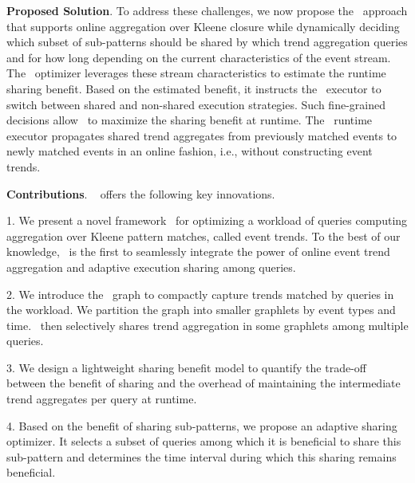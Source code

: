 \textbf{Proposed Solution}. 
To address these challenges, 
we now propose the \app\  approach that supports  online aggregation over Kleene closure while dynamically deciding which subset of sub-patterns should be shared by which trend aggregation queries and for how long depending on the current characteristics of the event stream.
The \app\ optimizer leverages these stream characteristics to estimate the runtime sharing benefit.  Based on the estimated benefit, it instructs the \app\ executor to switch between shared and non-shared execution strategies. Such fine-grained decisions allow \app\ to maximize the sharing benefit at runtime. 
%
The \app\ runtime executor propagates shared trend aggregates from previously matched events to newly matched events 
in an online fashion, i.e., without constructing event trends.

\textbf{Contributions}.
%
\app\ 
offers the following key innovations.

1. We present a novel framework \app\ for optimizing a workload of queries computing aggregation over Kleene pattern matches, called event trends. To the best of our knowledge, \app\ is the first to seamlessly integrate the power of online event trend aggregation and adaptive execution sharing among queries.


2. We introduce the \app\ graph to compactly capture  trends matched by queries in the workload. We partition the graph into smaller graphlets by event types and time. \app\ then selectively shares trend aggregation in some graphlets among multiple queries. 

3. We design a lightweight sharing benefit model to quantify the trade-off between the benefit of sharing and the overhead of maintaining the intermediate trend aggregates per query at runtime. 

4. Based on the benefit of sharing sub-patterns, we propose an adaptive sharing optimizer.
It selects a subset of queries among which it is beneficial to share this sub-pattern and determines the time interval during which this sharing remains beneficial.


